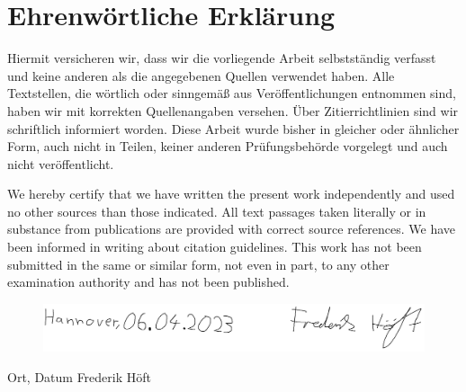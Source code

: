 \chapter*{Ehrenwörtliche Erklärung}

Hiermit versicheren wir, dass wir die vorliegende Arbeit selbstständig verfasst und keine anderen als die angegebenen Quellen verwendet haben. Alle Textstellen, die wörtlich oder sinngemäß aus Veröffentlichungen entnommen sind, haben wir mit korrekten Quellenangaben versehen. Über Zitierrichtlinien sind wir schriftlich informiert worden. Diese Arbeit wurde bisher in gleicher oder ähnlicher Form, auch nicht in Teilen, keiner anderen Prüfungsbehörde vorgelegt und auch nicht veröffentlicht.

\vspace{1cm}
\hspace{-.6cm}{\normalfont\Huge\bfseries Declaration of Authorship}
\vspace{0.75cm}

\hspace{-.6cm}We hereby certify that we have written the present work independently and used no other sources than those indicated. All text passages taken literally or in substance from publications are provided with correct source references. We have been informed in writing about citation guidelines. This work has not been submitted in the same or similar form, not even in part, to any other examination authority and has not been published.
\vspace{2cm}

\begin{figure}[H]
    \includegraphics[width=\linewidth]{images/UnterschriftFreddy}
\end{figure}
Ort, Datum \hfill Frederik Höft \hspace{1cm}

